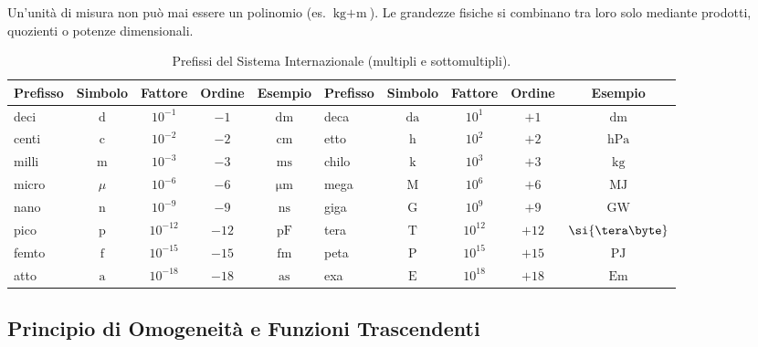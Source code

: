 \begin{esame}
Un'unità di misura non può mai essere un polinomio (es. $\si{\kilogram} + \si{\metre}$). Le grandezze fisiche si combinano tra loro solo mediante prodotti, quozienti o potenze dimensionali.
\end{esame}

\begin{table}[htbp]
\centering
\caption{Prefissi del Sistema Internazionale (multipli e sottomultipli).}
\label{tab:prefissi_si}
\begin{tabularx}{\textwidth}{lcccc|lcccc}
\toprule
\textbf{Prefisso} & \textbf{Simbolo} & \textbf{Fattore} & \textbf{Ordine} & \textbf{Esempio} & \textbf{Prefisso} & \textbf{Simbolo} & \textbf{Fattore} & \textbf{Ordine} & \textbf{Esempio} \\
\midrule
deci  & $\mathrm{d}$ & $10^{-1}$ & $-1$ & $\si{\deci\metre}$ & deca & $\mathrm{da}$ & $10^{1}$  & $+1$ & $\si{\deca\metre}$ \\
centi & $\mathrm{c}$ & $10^{-2}$ & $-2$ & $\si{\centi\metre}$ & etto & $\mathrm{h}$  & $10^{2}$  & $+2$ & $\si{\hecto\pascal}$ \\
milli & $\mathrm{m}$ & $10^{-3}$ & $-3$ & $\si{\milli\second}$ & chilo & $\mathrm{k}$  & $10^{3}$  & $+3$ & $\si{\kilo\gram}$ \\
micro & $\mu$        & $10^{-6}$ & $-6$ & $\si{\micro\metre}$ & mega & $\mathrm{M}$  & $10^{6}$  & $+6$ & $\si{\mega\joule}$ \\
nano  & $\mathrm{n}$ & $10^{-9}$ & $-9$ & $\si{\nano\second}$ & giga & $\mathrm{G}$  & $10^{9}$  & $+9$ & $\si{\giga\watt}$ \\
pico  & $\mathrm{p}$ & $10^{-12}$ & $-12$ & $\si{\pico\farad}$ & tera & $\mathrm{T}$  & $10^{12}$ & $+12$ & $\si{\tera\byte}$ \\
femto & $\mathrm{f}$ & $10^{-15}$ & $-15$ & $\si{\femto\metre}$ & peta & $\mathrm{P}$  & $10^{15}$ & $+15$ & $\si{\peta\joule}$ \\
atto  & $\mathrm{a}$ & $10^{-18}$ & $-18$ & $\si{\atto\second}$ & exa  & $\mathrm{E}$  & $10^{18}$ & $+18$ & $\si{\exa\metre}$ \\
\bottomrule
\end{tabularx}
\end{table}

\subsection{Principio di Omogeneità e Funzioni Trascendenti}

